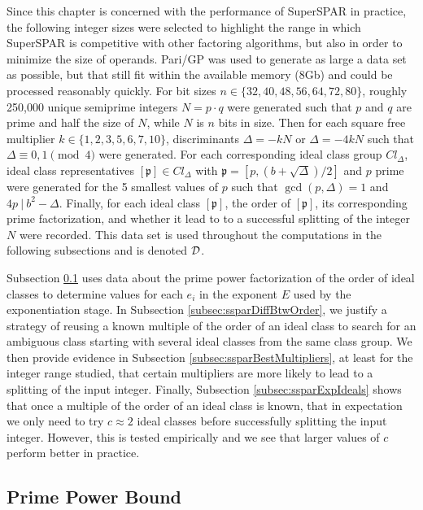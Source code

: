 \documentclass{ucalgthes1}
\theoremstyle{definition}
\newcommand{\ideal}{\mathfrak}
\newcommand{\idealclass}[1]{\left[ \ideal #1 \right]}
\begin{document}
Since this chapter is concerned with the performance of SuperSPAR in practice, the following integer sizes were selected to highlight the range in which SuperSPAR is competitive with other factoring algorithms, but also in order to minimize the size of operands.  Pari/GP was used to generate as large a data set as possible, but that still fit within the available memory (8Gb) and could be processed reasonably quickly.  For bit sizes $n \in \{32, 40, 48, 56, 64, 72, 80\}$, roughly 250,000 unique semiprime integers $N = p \cdot q$ were generated such that $p$ and $q$ are prime and half the size of $N$, while $N$ is $n$ bits in size.  Then for each square free multiplier $k \in \{1, 2, 3, 5, 6, 7, 10\}$, discriminants $\Delta = -kN$ or $\Delta = -4kN$ such that $\Delta \equiv 0, 1 \pmod 4$ were generated.  For each corresponding ideal class group $Cl_\Delta$, ideal class representatives $\idealclass p \in Cl_\Delta$ with $\ideal p = [p, (b+\sqrt\Delta)/2]$ and $p$ prime were generated for the 5 smallest values of $p$ such that $\gcd(p, \Delta) = 1$ and $4p ~|~ b^2 - \Delta$.  Finally, for each ideal class $\idealclass p$, the order of $\idealclass p$, its corresponding prime factorization, and whether it lead to to a successful splitting of the integer $N$ were recorded.  This data set is used throughout the computations in the following subsections and is denoted $\mathcal D$.

Subsection \ref{subsec:ssparPrimePowerBound} uses data about the prime power factorization of the order of ideal classes to determine values for each $e_i$ in the exponent $E$ used by the exponentiation stage.  In Subsection \ref{subsec:ssparDiffBtwOrder}, we justify a strategy of reusing a known multiple of the order of an ideal class to search for an ambiguous class starting with several ideal classes from the same class group.  We then provide evidence in Subsection \ref{subsec:ssparBestMultipliers}, at least for the integer range studied, that certain multipliers are more likely to lead to a splitting of the input integer.  Finally, Subsection \ref{subsec:ssparExpIdeals} shows that once a multiple of the order of an ideal class is known, that in expectation we only need to try $c \approx 2$ ideal classes before successfully splitting the input integer.  However, this is tested empirically and we see that larger values of $c$ perform better in practice.


\subsection{Prime Power Bound}
\label{subsec:ssparPrimePowerBound}
\end{document}
